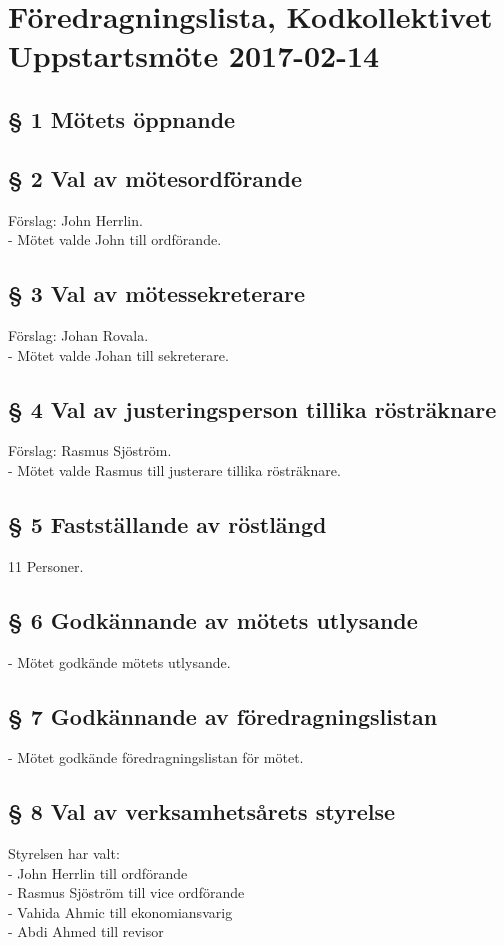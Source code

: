 \documentclass[11pt,swedish]{article}
\begin{document}
\section{\large Föredragningslista, Kodkollektivet Uppstartsmöte 2017-02-14}

\subsection{§ 1  Mötets öppnande}

\subsection{§ 2  Val av mötesordförande}
		Förslag: John Herrlin. \\
		\noindent - Mötet valde John till ordförande.

\subsection{§ 3  Val av mötessekreterare}
		Förslag: Johan Rovala. \\
		\noindent - Mötet valde Johan till sekreterare.

\subsection{§ 4  Val av justeringsperson tillika rösträknare}
		Förslag: Rasmus Sjöström. \\
		\noindent - Mötet valde Rasmus till justerare tillika rösträknare.

\subsection{§ 5  Fastställande av röstlängd}
		11 Personer.

\subsection{§ 6  Godkännande av mötets utlysande}
	- Mötet godkände mötets utlysande.
	
\subsection{§ 7  Godkännande av föredragningslistan}
	- Mötet godkände föredragningslistan för mötet.
	
\clearpage
\subsection{§ 8  Val av verksamhetsårets styrelse}
	Styrelsen har valt: \\
	- John Herrlin till ordförande \\
	- Rasmus Sjöström till vice ordförande \\
	- Vahida Ahmic till ekonomiansvarig \\
	- Abdi Ahmed till revisor \\
	
\end{document}
